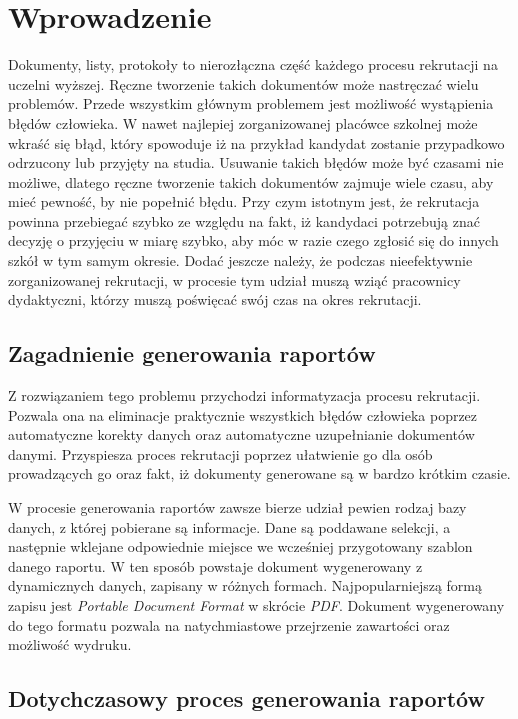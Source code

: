 \chapter{Wprowadzenie}

Dokumenty, listy, protokoły to nierozłączna część każdego procesu rekrutacji na uczelni wyższej. Ręczne tworzenie takich dokumentów może nastręczać wielu problemów. Przede wszystkim głównym problemem jest możliwość wystąpienia błędów człowieka. W nawet najlepiej zorganizowanej placówce szkolnej może wkraść się błąd, który spowoduje iż na przykład kandydat zostanie przypadkowo odrzucony lub przyjęty na studia. Usuwanie takich błędów może być czasami nie możliwe, dlatego ręczne tworzenie takich dokumentów zajmuje wiele czasu, aby mieć pewność, by nie popełnić błędu. Przy czym istotnym jest, że rekrutacja powinna przebiegać szybko ze względu na fakt, iż kandydaci potrzebują znać decyzję o przyjęciu w miarę szybko, aby móc w razie czego zgłosić się do innych szkół w tym samym okresie. Dodać jeszcze należy, że podczas nieefektywnie zorganizowanej rekrutacji, w procesie tym udział muszą wziąć pracownicy dydaktyczni, którzy muszą poświęcać swój czas na okres rekrutacji.


\section{ Zagadnienie generowania raportów}

Z rozwiązaniem tego problemu przychodzi informatyzacja procesu rekrutacji. Pozwala ona na eliminacje praktycznie wszystkich błędów człowieka poprzez automatyczne korekty danych oraz automatyczne uzupełnianie dokumentów danymi. Przyspiesza proces rekrutacji poprzez ułatwienie go dla osób prowadzących go oraz fakt, iż dokumenty generowane są w bardzo krótkim czasie. 
\par
W procesie generowania raportów zawsze bierze udział pewien rodzaj bazy danych, z której pobierane są informacje. Dane są poddawane selekcji, a następnie wklejane odpowiednie miejsce we wcześniej przygotowany szablon danego raportu. W ten sposób powstaje dokument wygenerowany z dynamicznych danych, zapisany w różnych formach. Najpopularniejszą formą zapisu jest \emph{Portable Document Format} w skrócie \emph{PDF}. Dokument wygenerowany do tego formatu pozwala na natychmiastowe przejrzenie zawartości oraz możliwość wydruku.


\section{ Dotychczasowy proces generowania raportów}

